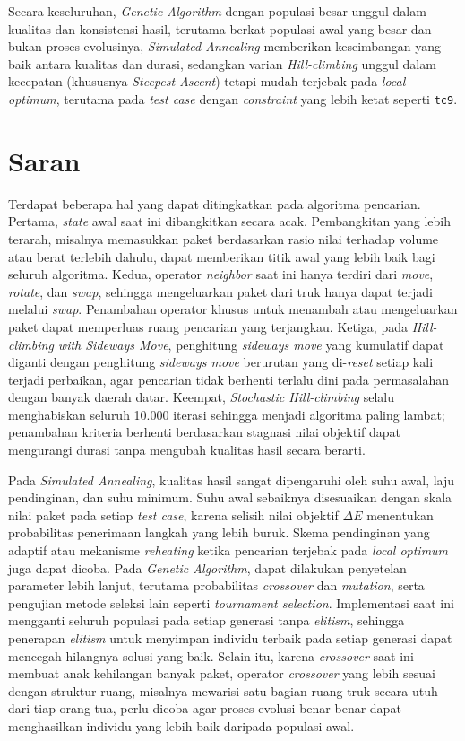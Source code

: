 Secara keseluruhan, \textit{Genetic Algorithm} dengan populasi besar unggul dalam kualitas dan konsistensi hasil, terutama berkat populasi awal yang besar dan bukan proses evolusinya, \textit{Simulated Annealing} memberikan keseimbangan yang baik antara kualitas dan durasi, sedangkan varian \textit{Hill-climbing} unggul dalam kecepatan (khususnya \textit{Steepest Ascent}) tetapi mudah terjebak pada \textit{local optimum}, terutama pada \textit{test case} dengan \textit{constraint} yang lebih ketat seperti \texttt{tc9}.

\section{Saran}

Terdapat beberapa hal yang dapat ditingkatkan pada algoritma pencarian. Pertama, \textit{state} awal saat ini dibangkitkan secara acak. Pembangkitan yang lebih terarah, misalnya memasukkan paket berdasarkan rasio nilai terhadap volume atau berat terlebih dahulu, dapat memberikan titik awal yang lebih baik bagi seluruh algoritma. Kedua, operator \textit{neighbor} saat ini hanya terdiri dari \textit{move}, \textit{rotate}, dan \textit{swap}, sehingga mengeluarkan paket dari truk hanya dapat terjadi melalui \textit{swap}. Penambahan operator khusus untuk menambah atau mengeluarkan paket dapat memperluas ruang pencarian yang terjangkau. Ketiga, pada \textit{Hill-climbing with Sideways Move}, penghitung \textit{sideways move} yang kumulatif dapat diganti dengan penghitung \textit{sideways move} berurutan yang di-\textit{reset} setiap kali terjadi perbaikan, agar pencarian tidak berhenti terlalu dini pada permasalahan dengan banyak daerah datar. Keempat, \textit{Stochastic Hill-climbing} selalu menghabiskan seluruh 10.000 iterasi sehingga menjadi algoritma paling lambat; penambahan kriteria berhenti berdasarkan stagnasi nilai objektif dapat mengurangi durasi tanpa mengubah kualitas hasil secara berarti.

Pada \textit{Simulated Annealing}, kualitas hasil sangat dipengaruhi oleh suhu awal, laju pendinginan, dan suhu minimum. Suhu awal sebaiknya disesuaikan dengan skala nilai paket pada setiap \textit{test case}, karena selisih nilai objektif $\Delta E$ menentukan probabilitas penerimaan langkah yang lebih buruk. Skema pendinginan yang adaptif atau mekanisme \textit{reheating} ketika pencarian terjebak pada \textit{local optimum} juga dapat dicoba. Pada \textit{Genetic Algorithm}, dapat dilakukan penyetelan parameter lebih lanjut, terutama probabilitas \textit{crossover} dan \textit{mutation}, serta pengujian metode seleksi lain seperti \textit{tournament selection}. Implementasi saat ini mengganti seluruh populasi pada setiap generasi tanpa \textit{elitism}, sehingga penerapan \textit{elitism} untuk menyimpan individu terbaik pada setiap generasi dapat mencegah hilangnya solusi yang baik. Selain itu, karena \textit{crossover} saat ini membuat anak kehilangan banyak paket, operator \textit{crossover} yang lebih sesuai dengan struktur ruang, misalnya mewarisi satu bagian ruang truk secara utuh dari tiap orang tua, perlu dicoba agar proses evolusi benar-benar dapat menghasilkan individu yang lebih baik daripada populasi awal.

